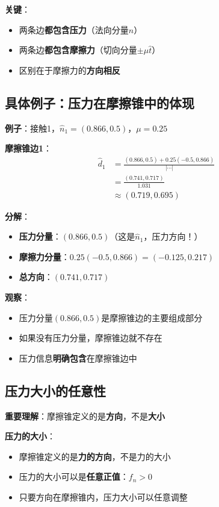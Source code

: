 \documentclass[12pt,a4paper]{article}
\begin{document}
\textbf{关键}：
\begin{itemize}
\item 两条边\textbf{都包含压力}（法向分量$\hat{n}$）
\item 两条边\textbf{都包含摩擦力}（切向分量$\pm \mu \hat{t}$）
\item 区别在于摩擦力的\textbf{方向相反}
\end{itemize}

\subsection{具体例子：压力在摩擦锥中的体现}

\textbf{例子}：接触1，$\hat{n}_1 = (0.866, 0.5)$，$\mu = 0.25$

\textbf{摩擦锥边1}：
\begin{align}
\hat{d}_1 &= \frac{(0.866, 0.5) + 0.25(-0.5, 0.866)}{|\cdots|} \\
&= \frac{(0.741, 0.717)}{1.031} \\
&\approx (0.719, 0.695)
\end{align}

\textbf{分解}：
\begin{itemize}
\item \textbf{压力分量}：$(0.866, 0.5)$（这是$\hat{n}_1$，压力方向！）
\item \textbf{摩擦力分量}：$0.25(-0.5, 0.866) = (-0.125, 0.217)$
\item \textbf{总方向}：$(0.741, 0.717)$
\end{itemize}

\textbf{观察}：
\begin{itemize}
\item 压力分量$(0.866, 0.5)$是摩擦锥边的主要组成部分
\item 如果没有压力分量，摩擦锥边就不存在
\item 压力信息\textbf{明确包含}在摩擦锥边中
\end{itemize}

\subsection{压力大小的任意性}

\textbf{重要理解}：摩擦锥定义的是\textbf{方向}，不是\textbf{大小}

\textbf{压力的大小}：
\begin{itemize}
\item 摩擦锥定义的是\textbf{力的方向}，不是力的大小
\item 压力的大小可以是\textbf{任意正值}：$f_n > 0$
\item 只要方向在摩擦锥内，压力大小可以任意调整
\end{itemize}
\end{document}
